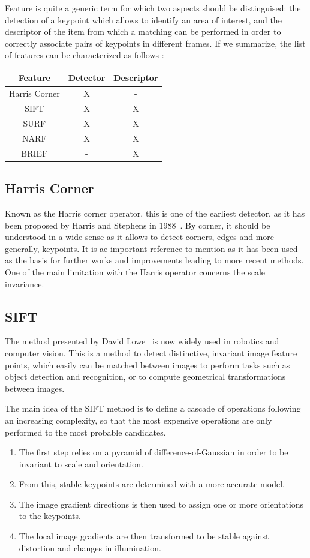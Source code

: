 Feature is quite a generic term for which two aspects should be distinguised: the detection of a keypoint which allows to identify an area of interest, and the descriptor of the item from which a matching can be performed in order to correctly associate pairs of keypoints in different frames. If we summarize, the list of features can be characterized as follows :

\begin{center}
\begin{tabular}{|c|cc|}
\hline
Feature & Detector & Descriptor \\
\hline
Harris Corner & X & - \\
SIFT & X & X \\
SURF & X & X \\
NARF & X & X \\
BRIEF & - & X \\
\hline
\end{tabular}
\end{center}

\subsection{Harris Corner}

Known as the Harris corner operator, this is one of the earliest detector, as it has been proposed by Harris and Stephens in 1988~\cite{Harris88alvey}. By corner, it should be understood in a wide sense as it allows to detect corners, edges and more generally, keypoints. It is ae important reference to mention as it has been used as the basis for further works and improvements leading to more recent methods. One of the main limitation with the Harris operator concerns the scale invariance.

\subsection{SIFT}

The method presented by David Lowe~\cite{lowe_2004_sift} is now widely used in robotics and computer vision.
This is a method to detect distinctive, invariant image feature points, which easily can be matched between images to perform tasks such as object detection and recognition, or to compute geometrical transformations between images.

The main idea of the SIFT method is to define a cascade of operations following an increasing complexity, so that the most expensive operations are only performed to the most probable candidates.
\begin{enumerate}
\item The first step relies on a pyramid of difference-of-Gaussian in order to be invariant to scale and orientation.
\item From this, stable  keypoints are determined with a more accurate model.
\item The image gradient directions is then used to assign one or more orientations to the keypoints.
\item The local image gradients are then transformed to be stable against distortion and changes in illumination.
\end{enumerate}


